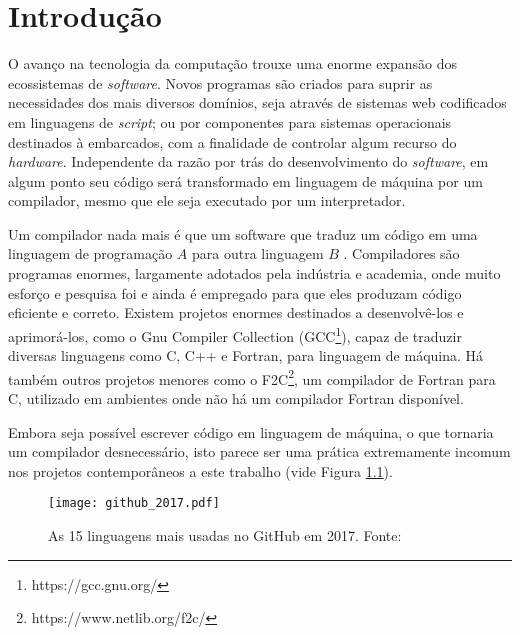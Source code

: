 \chapter{Introdução}
\label{cap:introducao}

O avanço na tecnologia da computação trouxe uma enorme expansão
dos ecossistemas de \textit{software}. Novos programas são criados para
suprir as necessidades dos mais diversos domínios, seja através de sistemas web 
codificados em linguagens de \textit{script}; ou por componentes para
sistemas operacionais destinados à embarcados, com a finalidade de controlar algum
recurso do \textit{hardware}. Independente da razão por trás do desenvolvimento
do \textit{software}, em algum ponto seu código será transformado em linguagem
de máquina por um compilador, mesmo que ele seja executado por um
interpretador.

Um compilador nada mais é que um software que traduz um código em uma linguagem
de programação $A$ para outra linguagem $B$ \citep{dragonbook}.  Compiladores
são programas enormes, largamente adotados pela indústria e academia, onde muito
esforço e pesquisa foi e ainda é empregado para que eles produzam código
eficiente e correto. Existem projetos enormes destinados a desenvolvê-los e
aprimorá-los, como o Gnu Compiler Collection
(GCC\footnote{https://gcc.gnu.org/}), capaz de traduzir diversas linguagens
como C, C++ e Fortran, para linguagem de máquina. Há também outros projetos
menores como o F2C\footnote{https://www.netlib.org/f2c/}, um compilador de
Fortran para C, utilizado em ambientes onde não há um compilador Fortran
disponível.

Embora seja possível escrever código em linguagem de máquina, o que
tornaria um compilador desnecessário, isto parece ser uma prática extremamente
incomum nos projetos contemporâneos a este trabalho \citep{githuboctoverse} (vide
Figura \ref{fig:github_2017}).

\begin{figure}[ht]
 \centering
 \texttt{[image: github\_2017.pdf]}
 \caption{As 15 linguagens mais usadas no GitHub em 2017. Fonte: \cite{githuboctoverse}}
 \label{fig:github_2017}
\end{figure}

